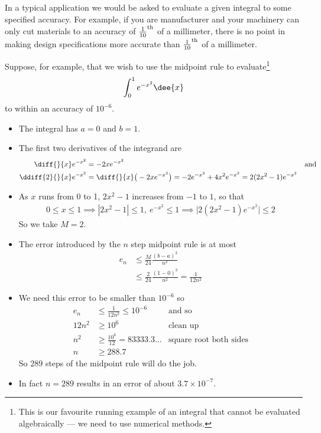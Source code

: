 In a typical application we would be asked to evaluate a given integral
to some specified accuracy. For example, if you are manufacturer and your
machinery can only cut materials to an accuracy of ${\tfrac{1}{10}}^{\rm
th}$ of a millimeter, there is no point in making design specifications
 more accurate than  ${\tfrac{1}{10}}^{\rm th}$ of a millimeter.
\begin{eg}\label{eg:MidpointErr2}
Suppose, for example, that we wish to use the midpoint rule to evaluate\footnote{This is
our favourite running example of an integral that cannot be evaluated algebraically ---
we need to use numerical methods.}
\begin{align*}
  \int_0^1 e^{-x^2}\dee{x}
\end{align*}
to within an accuracy of $10^{-6}$.

\soln
\begin{itemize}
  \item The integral has $a=0$ and $b=1$.
 \item The first two derivatives of the integrand are
\begin{align*}
\diff{}{x}e^{-x^2}&=-2xe^{-x^2} & \text{and} \\
\ddiff{2}{}{x}e^{-x^2}
  &=\diff{}{x}\big(-2xe^{-x^2}\big)  =-2e^{-x^2}+4x^2e^{-x^2}=2(2x^2-1)e^{-x^2}
\end{align*}
\item As $x$ runs from 0 to 1, $2x^2-1$ increases from $-1$ to $1$, so that
\begin{align*}
0\le x\le 1\implies |2x^2-1|\le 1,\ e^{-x^2}\le 1\implies
\big|2(2x^2-1)e^{-x^2}\big|\le 2
\end{align*}
So we take $M=2$.

\item The error introduced by the $n$ step midpoint rule is at most
\begin{align*}
  e_n & \leq \frac{M}{24}\frac{(b-a)^3}{n^2}\\
  &\leq \frac{2}{24}\frac{(1-0)^3}{n^2} = \frac{1}{12n^2}
\end{align*}
\item We need this error to be smaller than $10^{-6}$ so
\begin{align*}
  e_n & \leq \frac{1}{12n^2} \leq 10^{-6} & \text{and so }\\
  12n^2 &\geq 10^6 & \text{clean up}\\
  n^2 &\geq \frac{10^6}{12} = 83333.3\dots & \text{square root both sides}\\
  n &\geq 288.7
\end{align*}
So $289$ steps of the midpoint rule will do the job.
\item In fact $n=289$ results in an error of about $3.7\times 10^{-7}$.
\end{itemize}
\end{eg}
